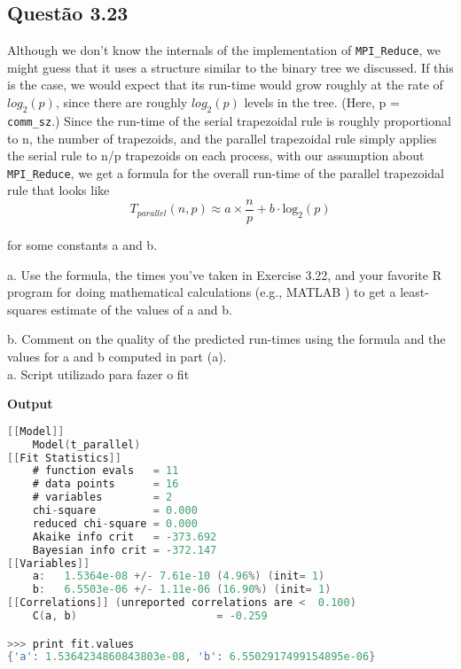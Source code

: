 

\subsection{Questão 3.23}

Although we don’t know the internals of the implementation of \texttt{MPI\_Reduce}, we might guess that it uses a structure similar to the binary tree we discussed. If this is the case, we would expect that its run-time would grow roughly at the rate of  $log_{2}(p)$, since there are roughly $log_{2}(p)$ levels in the tree. (Here, p = \texttt{comm\_sz}.) Since the run-time of the serial trapezoidal rule is roughly proportional to n, the number of trapezoids, and the parallel trapezoidal rule simply applies the serial rule to n/p trapezoids on each process, with our assumption about \texttt{MPI\_Reduce}, we get a formula for the overall run-time of the parallel trapezoidal rule that looks like
\begin{equation*}
T_{parallel}(n, p) \approx a \times \frac{n}{p} + b \cdot \mathrm{log}_{2}(p)
\end{equation*}

for some constants a and b.

a. Use the formula, the times you’ve taken in Exercise 3.22, and your favorite R program for doing mathematical calculations (e.g., MATLAB ) to get a least-squares estimate of the values of a and b.

b. Comment on the quality of the predicted run-times using the formula and the values for a and b computed in part (a).\\

a. Script utilizado para fazer o fit

\textbf{Output}
\begin{lstlisting}[language=C]
[[Model]]
    Model(t_parallel)
[[Fit Statistics]]
    # function evals   = 11
    # data points      = 16
    # variables        = 2
    chi-square         = 0.000
    reduced chi-square = 0.000
    Akaike info crit   = -373.692
    Bayesian info crit = -372.147
[[Variables]]
    a:   1.5364e-08 +/- 7.61e-10 (4.96%) (init= 1)
    b:   6.5503e-06 +/- 1.11e-06 (16.90%) (init= 1)
[[Correlations]] (unreported correlations are <  0.100)
    C(a, b)                      = -0.259

>>> print fit.values
{'a': 1.5364234860843803e-08, 'b': 6.5502917499154895e-06}
\end{lstlisting}

